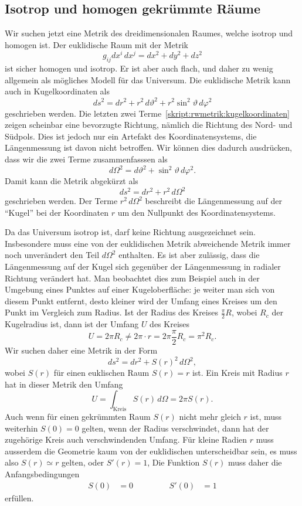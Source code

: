\subsection{Isotrop und homogen gekrümmte Räume}
Wir suchen jetzt eine Metrik des dreidimensionalen Raumes, welche
isotrop und homogen ist.
Der euklidische Raum mit der Metrik
\[
g_{ij}dx^i\,dx^j
=
dx^2 + dy^2 + dz^2
\]
ist sicher homogen und isotrop. 
Er ist aber auch flach, und daher zu wenig allgemein als mögliches
Modell für das Universum.
Die euklidische Metrik kann auch in Kugelkoordinaten als
\begin{equation}
ds^2
=
dr^2
+ 
r^2\,d\vartheta^2
+
r^2\sin^2\vartheta\,d\varphi^2
\label{skript:rwmetrik:kugelkoordinaten}
\end{equation}
geschrieben werden.
Die letzten zwei Terme~\eqref{skript:rwmetrik:kugelkoordinaten}
zeigen scheinbar eine bevorzugte Richtung, nämlich die Richtung
des Nord- und Südpols.
Dies ist jedoch nur ein Artefakt des Koordinatensystems, die 
Längenmessung ist davon nicht betroffen.
Wir können dies dadurch ausdrücken, dass wir die zwei Terme
zusammenfasssen als
\begin{equation}
d\Omega^2 = d\vartheta^2 + \sin^2\vartheta\,d\varphi^2.
\end{equation}
Damit kann die Metrik abgekürzt als
\begin{equation}
ds^2 = dr^2 + r^2\,d\Omega^2
\end{equation}
geschrieben werden.
Der Terme $r^2\,d\Omega^2$ beschreibt die Längenmessung auf der
``Kugel'' bei der Koordinaten $r$ um den Nullpunkt des
Koordinatensystems.

Da das Universum isotrop ist, darf keine Richtung ausgezeichnet sein.
Insbesondere muss eine von der euklidischen Metrik abweichende
Metrik immer noch unverändert den Teil $d\Omega^2$ enthalten.
Es ist aber zulässig, dass die Längenmessung auf der Kugel sich
gegenüber der Längenmessung in radialer Richtung verändert hat.
Man beobachtet dies zum Beispiel auch in der Umgebung eines Punktes
auf einer Kugeloberfläche: je weiter man sich von diesem Punkt entfernt,
desto kleiner wird der Umfang eines Kreises um den Punkt im Vergleich
zum Radius. 
Ist der Radius des Kreises $\frac{\pi}2R$, wobei $R_c$ der Kugelradius ist,
dann ist der Umfang $U$ des Kreises
\[
U=2\pi R_c \ne 2\pi \cdot r = 2\pi\frac{\pi}2R_c=\pi^2 R_c.
\]
Wir suchen daher eine Metrik in der Form
\[
ds^2 
=
dr^2 + S(r)^2 \,d\Omega^2,
\]
wobei $S(r)$ für einen euklischen Raum $S(r)=r$ ist.
Ein Kreis mit Radius $r$ hat in dieser Metrik den Umfang
\[
U=\int_{\textrm{Kreis}} S(r)\,d\Omega = 2\pi S(r).
\]
Auch wenn für einen gekrümmten Raum $S(r)$ nicht mehr gleich $r$ ist,
muss weiterhin $S(0)=0$ gelten, wenn der Radius verschwindet, dann
hat der zugehörige Kreis auch verschwindenden Umfang.
Für kleine Radien $r$ muss ausserdem die Geometrie kaum von der
euklidischen unterscheidbar sein, es muss also $S(r)\simeq r$ gelten,
oder $S'(r)=1$,
Die Funktion $S(r)$ muss daher die Anfangsbedingungen
\begin{equation}
\begin{aligned}
S(0)&=0&&\qquad&S'(0)&=1
\end{aligned}
\label{skript:rwmetrik:Safangsbedingungen}
\end{equation}
erfüllen.

